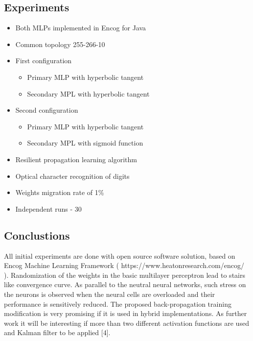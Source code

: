\documentclass[a0,portrait,25pt]{sciposter}
\begin{document}
\begin{multicols}{3}
\begin{mdframed}[backgroundcolor=white,roundcorner=4pt,shadow=true,linewidth=1pt]
\color{Black}
\section*{Experiments}
\begin{itemize}
\item Both MLPs implemented in Encog for Java
\item Common topology 255-266-10
\item First configuration
\begin{itemize}
  \item Primary MLP with hyperbolic tangent
  \item Secondary MPL with hyperbolic tangent
\end{itemize}
\item Second configuration
\begin{itemize}
  \item Primary MLP with hyperbolic tangent
  \item Secondary MPL with sigmoid function
\end{itemize}
\item Resilient propagation learning algorithm
\item Optical character recognition of digits
\item Weights migration rate of 1\%
\item Independent runs - 30
\end{itemize}
\end{mdframed}

\begin{mdframed}[backgroundcolor=white,roundcorner=4pt,shadow=true,linewidth=1pt]
\color{Black}
\section*{Conclustions}
All initial experiments are done with open source software solution, based on Encog Machine Learning Framework ( https://www.heatonresearch.com/encog/ ). Randomization of the weights in the basic multilayer perceptron lead to stairs like convergence curve. As parallel to the neutral neural networks, such stress on the neurons is observed when the neural cells are overloaded and their performance is sensitively reduced. The proposed back-propagation training modification is very promising if it is used in hybrid implementations. As further work it will be interesting if more than two different activation functions are used and Kalman filter to be applied [4]. 
\end{mdframed}


\end{multicols}
\end{document}
